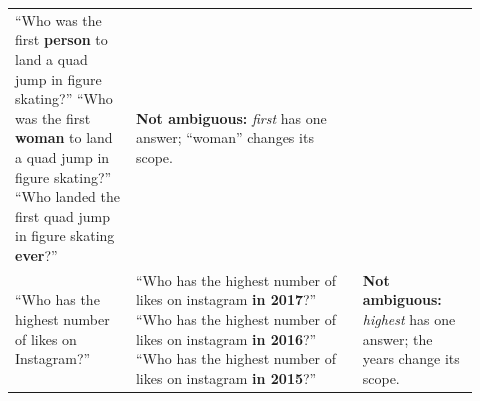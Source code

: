 \begin{table}[ht]
\begin{tabular}{@{}p{0.24\linewidth}p{0.45\linewidth}p{0.23\linewidth}@{}}
        \raggedright ``Who was the first \textbf{person} to land a quad jump in
        figure skating?''
        \newline ``Who was the first \textbf{woman} to land a quad jump in
        figure skating?''
        \newline ``Who landed the first quad jump in figure skating
        \textbf{ever}?'' &
        \raggedright \textbf{Not ambiguous:} \emph{first} has one answer;
        ``woman'' changes its scope. \tabularnewline
        \addlinespace
        \raggedright ``Who has the highest number of likes on Instagram?'' &
        \raggedright ``Who has the highest number of likes on instagram
        \textbf{in 2017}?''
        \newline ``Who has the highest number of likes on instagram
        \textbf{in 2016}?''
        \newline ``Who has the highest number of likes on instagram
        \textbf{in 2015}?'' &
        \raggedright \textbf{Not ambiguous:} \emph{highest} has one answer;
        the years change its scope. \tabularnewline
        \bottomrule
    \end{tabular}

\end{table}
